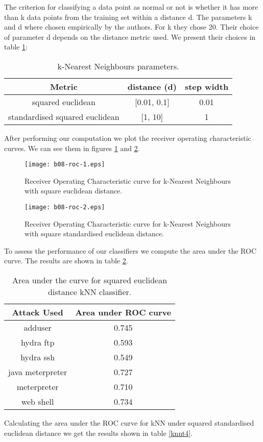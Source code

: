 \documentclass[reqno,openany,12pt]{amsbook}
\begin{document}
The criterion for classifying a data point as normal or not is whether it has more than k data points from the training set within a distance d. The parameters k and d where chosen empirically by the authors. For k they chose 20. Their choice of parameter d depends on the distance metric used. We present their choices\cite{adf1} in table \ref{knnt2}:
\begin{table}
\begin{tabular}{|c|c|c|}
\hline
Metric &  distance (d) & step width  \\ \hline 
squared euclidean & [0.01, 0.1] & 0.01 \\ \hline
standardised squared euclidean & [1, 10] & 1 \\ \hline
\end{tabular}
\vspace{5pt}
\caption{k-Nearest Neighbours parameters.}
\label{knnt2}
\end{table}

After performing our computation we plot the receiver operating characteristic curves. We can see them in figures \ref{knnroc1} and \ref{knnroc2}.

\begin{figure}
\texttt{[image: b08-roc-1.eps]}
\caption{Receiver Operating Characteristic curve for k-Nearest Neighbours with square euclidean distance.}
\label{knnroc1}
\end{figure}
\begin{figure}
\texttt{[image: b08-roc-2.eps]}
\caption{Receiver Operating Characteristic curve for k-Nearest Neighbours with square standardised euclidean distance.}
\label{knnroc2}
\end{figure}

To assess the performance of our classifiers we compute the area under the ROC curve. The results are shown in table \ref{knnt3}.
\begin{table}
\begin{tabular}{|c|c|}
\hline
Attack Used &  Area under ROC curve \\ \hline 
adduser          & 0.745 \\ \hline
hydra ftp        & 0.593 \\ \hline
hydra ssh        & 0.549 \\ \hline
java meterpreter & 0.727 \\ \hline
meterpreter      & 0.710 \\ \hline
web shell        & 0.734 \\ \hline
\end{tabular}
\vspace{5pt}
\caption{Area under the curve for squared euclidean distance kNN classifier.}
\label{knnt3}
\end{table}
Calculating the area under the ROC curve for kNN under squared standardised euclidean distance we get the results shown in table \ref{knnt4}.
\end{document}
